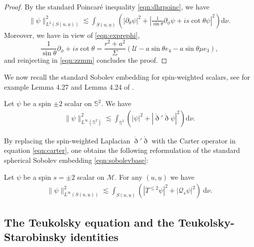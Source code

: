 \documentclass[reqno]{amsart}
\numberwithin{equation}{section}
\newcommand{\intS}{\int_{S(u,\ubar)}}
\newcommand{\mcm}{\mathcal{M}}
\newcommand{\mcq}{\mathcal{Q}}
\newcommand{\mcu}{\mathcal{U}}
\newcommand{\ubar}{{\underline{u}}}
\newcommand{\dee}{\mathrm{d}}
\newcommand{\drond}{\mathring{\eth}}
\newcommand{\sph}{\mathbb S}
\theoremstyle{plain}
\theoremstyle{definition}
\theoremstyle{remark}
\numberwithin{equation}{section}
\begin{document}
\begin{proof}
By the standard Poincaré inequality \eqref{eqn:dhrpoinc}, we have 
\begin{align}\label{eqn:zzmm}
    \|\psi\|^2_{L^2(S(u,\ubar))}\lesssim\intS\left(|\partial_\theta\psi|^2+\left|\frac{1}{\sin\theta}\partial_\phi\psi+is\cot\theta\psi\right|^2\right)\dee\nu.
\end{align}
Moreover, we have in view of \eqref{eqn:exprephi},
$$\frac{1}{\sin\theta}\partial_\phi+is\cot\theta=\frac{r^2+a^2}{\Sigma}\left(\mcu-a\sin\theta e_4-a\sin\theta\mu e_3\right),$$
and reinjecting in \eqref{eqn:zzmm} concludes the proof.
\end{proof}
We now recall the standard Sobolev embedding for spin-weighted scalars, see for example Lemma 4.27 and Lemma 4.24 of \cite{mablueandersson}.
\begin{prop}
    Let $\psi$ be a spin $\pm 2$ scalar on $\sph^2$. We have 
\begin{align}\label{eqn:sobolevbase}
    \|\psi\|^2_{L^\infty(\sph^2)}\lesssim\int_{\sph^2}\left(|\psi|^2+|\drond'\drond\psi|^2\right)\dee\nu.
\end{align}
\end{prop}
By replacing the spin-weighted Laplacian $\drond'\drond$ with the Carter operator in equation \eqref{eqn:carter}, one obtains the following reformulation of the standard spherical Sobolev embedding \eqref{eqn:sobolevbase}:
\begin{prop}\label{prop:sobolev}
    Let $\psi$ be a spin $s=\pm 2$ scalar on $\mcm$. For any $(u,\ubar)$ we have
\begin{align}\label{eqn:sobolev}
    \|\psi\|^2_{L^\infty(S(u,\ubar))}{\lesssim}\int_{S(u,\ubar)}\left(|T^{\leq 2}\psi|^2+|\mcq_s\psi|^2\right)\:\dee\nu.
\end{align}
\end{prop}
\subsection{The Teukolsky equation and the Teukolsky-Starobinsky identities}\label{section:eqs}
\end{document}
